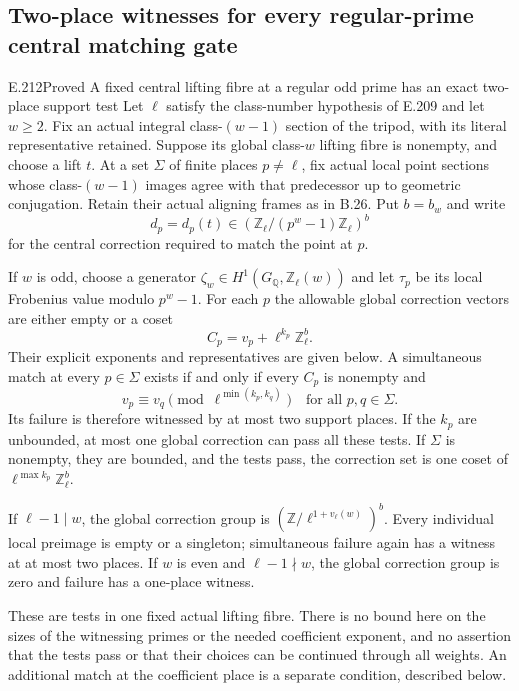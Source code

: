 \subsection{Two-place witnesses for every regular-prime central matching gate}

\begin{result}{E.212}{Proved}
{A fixed central lifting fibre at a regular odd prime has an exact two-place support test}
Let $\ell$ satisfy the class-number hypothesis of E.209 and let
$w\ge2$. Fix an actual integral class-$(w-1)$ section of the
tripod, with its literal representative retained. Suppose its
global class-$w$ lifting fibre is nonempty, and choose a lift $t$.
At a set $\Sigma$ of finite places $p\ne\ell$, fix actual local
point sections whose class-$(w-1)$ images agree with that
predecessor up to geometric conjugation. Retain their actual
aligning frames as in B.26. Put $b=b_w$ and write
\[
 d_p=d_p(t)\in
 \left(\mathbb Z_\ell/(p^w-1)\mathbb Z_\ell\right)^b
 \tag{E.212.1}
\]
for the central correction required to match the point at $p$.

If $w$ is odd, choose a generator
$\zeta_w\in H^1(G_{\mathbb Q},\mathbb Z_\ell(w))$
and let $\tau_p$ be its local Frobenius value modulo $p^w-1$.
For each $p$ the allowable global correction vectors are either
empty or a coset
\[
 C_p=v_p+\ell^{k_p}\mathbb Z_\ell^b.
 \tag{E.212.2}
\]
Their explicit exponents and representatives are given below.
A simultaneous match at every $p\in\Sigma$ exists if and only
if every $C_p$ is nonempty and
\[
 v_p\equiv v_q\pmod{\ell^{\min(k_p,k_q)}}
       \quad\text{for all }p,q\in\Sigma.
 \tag{E.212.3}
\]
Its failure is therefore witnessed by at most two support places.
If the $k_p$ are unbounded, at most one global correction can
pass all these tests.
If $\Sigma$ is nonempty, they are bounded, and the tests pass, the correction set
is one coset of $\ell^{\max k_p}\mathbb Z_\ell^b$.

If $\ell-1\mid w$, the global correction group is
$(\mathbb Z/\ell^{1+v_\ell(w)})^b$. Every individual local
preimage is empty or a singleton; simultaneous failure again
has a witness at at most two places. If $w$ is even and
$\ell-1\nmid w$, the global correction group is zero and
failure has a one-place witness.

These are tests in one fixed actual lifting fibre. There is no
bound here on the sizes of the witnessing primes or the needed
coefficient exponent, and no assertion that the tests pass or
that their choices can be continued through all weights.
An additional match at the coefficient place is a separate
condition, described below.
\end{result}


